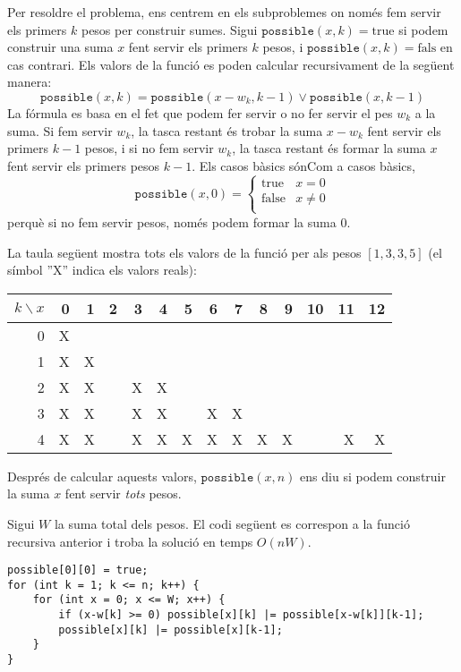 Per resoldre el problema, ens centrem en els subproblemes
on només fem servir els primers $k$ pesos
per construir sumes.
Sigui $\texttt{possible}(x,k)=\textrm{true}$ si
podem construir una suma $x$
fent servir els primers $k$ pesos,
i $\texttt{possible}(x,k)=\textrm{fals}$ en cas contrari.
Els valors de la funció es poden calcular recursivament
de la següent manera:
\[ \texttt{possible}(x,k) = \texttt{possible}(x-w_k,k-1) \lor \texttt{possible}(x,k-1) \]
La fórmula es basa en el fet que podem
fer servir o no fer servir el pes $w_k$ a la suma.
Si fem servir $w_k$, la tasca restant és
trobar la suma $x-w_k$ fent servir els primers $k-1$ pesos,
i si no fem servir $w_k$,
la tasca restant és formar la suma $x$
fent servir els primers pesos $k-1$.
Els casos bàsics sónCom a casos bàsics,
\begin{equation*}
    \texttt{possible}(x,0) = \begin{cases}
               \textrm{true}    & x = 0\\
               \textrm{false}   & x \neq 0 \\
           \end{cases}
\end{equation*}
perquè si no fem servir pesos, només podem formar la suma 0.

La taula següent mostra tots els valors de la funció
per als pesos $[1,3,3,5]$ (el símbol ''X''
indica els valors reals):

\begin{centre}
\begin{tabular}{r|rrrrrrrrrrrrr}
$k \backslash x$ & 0 & 1 & 2 & 3 & 4 & 5 & 6 & 7 & 8 & 9 & 10 & 11 & 12 \\
\hline
 0 & X & \\
 1 & X & X \\
 2 & X & X & & X & X \\
 3 & X & X & & X & X & & X & X \\
 4 & X & X & & X & X & X & X & X & X & X & & X & X \\
\end{tabular}
\end{centre}

Després de calcular aquests valors, $\texttt{possible}(x,n)$
ens diu si podem construir la
suma $x$ fent servir \emph{tots} pesos.

Sigui $W$ la suma total dels pesos.
El codi següent es correspon a la funció recursiva anterior i troba la
solució en temps $O(nW)$.
\begin{lstlisting}
possible[0][0] = true;
for (int k = 1; k <= n; k++) {
    for (int x = 0; x <= W; x++) {
        if (x-w[k] >= 0) possible[x][k] |= possible[x-w[k]][k-1];
        possible[x][k] |= possible[x][k-1];
    }
}
\end{lstlisting}

